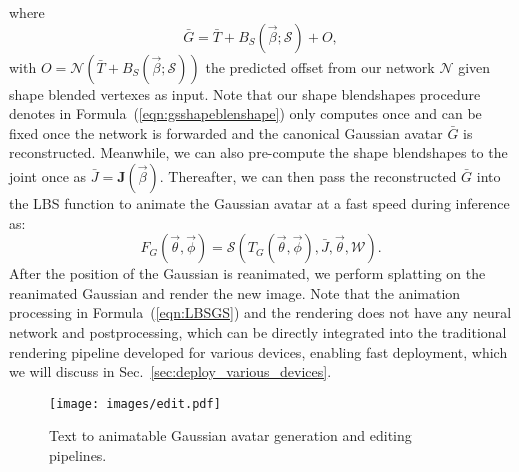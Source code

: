 where 
\begin{equation}
    \label{eqn:gsshapeblenshape}
    \bar{G} = \bar{T} + B_{S}(\vec{\beta}; \mathcal{S}) + O,
\end{equation}
with $O = \mathcal{N}(\bar{T} + B_{S}(\vec{\beta}; \mathcal{S}))$ the predicted offset from our network $\mathcal{N}$ given shape blended vertexes as input. Note that our shape blendshapes procedure denotes in Formula~(\ref{eqn:gsshapeblenshape}) only computes once and can be fixed once the network is forwarded and the canonical Gaussian avatar $\bar{G}$ is reconstructed. Meanwhile, we can also pre-compute the shape blendshapes to the joint once as $\bar{J}=\textbf{J}(\vec{\beta})$. Thereafter, we can then pass the reconstructed $\bar{G}$ into the LBS function to animate the Gaussian avatar at a fast speed during inference as:
\begin{equation}
    \label{eqn:LBSGS}
    F_{G}(\vec{\theta}, \vec{\phi}) = \mathcal{S}(T_{G}(\vec{\theta}, \vec{\phi}), \bar{J}, \vec{\theta}, \mathcal{W}).
\end{equation}
After the position of the Gaussian is reanimated, we perform splatting on the reanimated Gaussian and render the new image. Note that the animation processing in Formula~(\ref{eqn:LBSGS}) and the rendering does not have any neural network and postprocessing, which can be directly integrated into the traditional rendering pipeline developed for various devices, enabling fast deployment, which we will discuss in Sec.~\ref{sec:deploy_various_devices}.

\begin{figure}
    \centering
    \texttt{[image: images/edit.pdf]}
    \caption{Text to animatable Gaussian avatar generation and editing pipelines.}
    \label{fig:text-style-gen}
    \vspace{-0.1in}
\end{figure}

